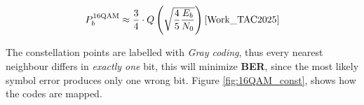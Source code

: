 \begin{equation}
  P_b^{\text{16QAM}} \approx \frac{3}{4}\cdot Q\left(\sqrt{\frac{4}{5}\frac{E_b}{N_0}}\right)\text{\cite{Work_TAC2025}}
  \label{eq:probErr16QAM}
\end{equation}


The constellation points are labelled with \emph{Gray coding}, thus every nearest neighbour differs in \emph{exactly one} bit, this will minimize \textbf{BER}, since the most likely symbol error produces only one wrong bit. Figure \ref{fig:16QAM_const}, shows how the codes are mapped.

